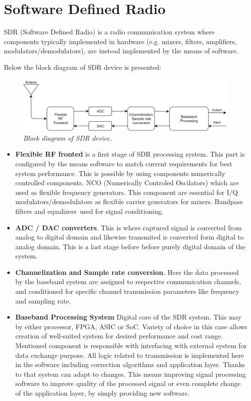 \documentclass[en,printmode]{mgr}
\begin{document}
	\section{Software Defined Radio}
		SDR (Software Defined Radio) is a radio communication system where components typically implemented in hardware 
		(e.g. mixers, filters, amplifiers, modulators/demodulators), are instead implemented by the means of software.
		
		Below the block diagram of SDR device is presented:
		\begin{figure}[!htb]
    		\centering
   			\includegraphics[width=\textwidth]{diag/sdr.png}
    		\caption{\textit{Block diagram of SDR device.}}
		\end{figure}
		
		\begin{itemize}
			\item \textbf{Flexible RF fronted} is a first stage of SDR processing system. This part is configured by the means
			software to match current requirements for best system performance. This is possible by using components numerically
			controlled components.
			NCO (Numerically Controled Oscilators) which are used as flexible frequency generators. This component are
			essential for I/Q modulators/demodulators as flexible carrier generators for mixers. Bandpass filters and equalizers\
			used for signal conditioning.
			
			\item \textbf{ADC / DAC converters}. This is where captured signal is converted from analog to digital domain and
			likewise transmited is converted form digital to analog domain. This is a last stage before before purely digital 
			domain of the system.
			
			\item \textbf{Channelization and Sample rate conversion}. Here the data processed by the baseband system are assigned
			to respective communication channels, and conditioned for specific channel transmission parameters like frequency and
			sampling rate.
			
			\item \textbf{Baseband Processing System} Digital core of the SDR system. This may by either processor, FPGA, ASIC or
			SoC. Variety of choice in this case allows creation of well-suited system for desired performance and cost range. 
			Mentioned component is responsible with interfacing with external system for data exchange purpose. All logic related to
			transmission is implemented here in the software including correction algorithms and application layer. Thanks to that
			system can adapt to changes. This means improving signal processing software to improve quality of the processed signal
			or even complete change of the application layer, by simply providing new software.
		\end{itemize}
		
\end{document}
